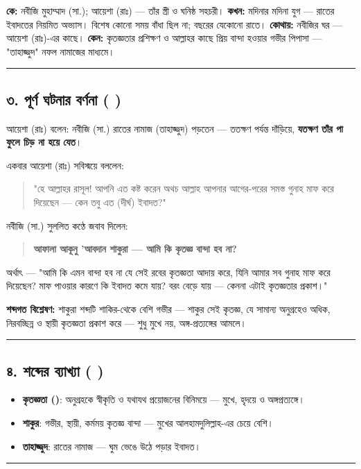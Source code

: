\textbf{কে:} নবীজি মুহাম্মাদ (সা.); আয়েশা (রাঃ) — তাঁর স্ত্রী ও ঘনিষ্ঠ সহচরী।
\textbf{কখন:} মদিনার মদিনা যুগ — রাতের ইবাদতের নিয়মিত অভ্যাস। বিশেষ কোনো সময় বাঁধা ছিল না; বছরের যেকোনো রাতে।
\textbf{কোথায়:} নবীজির ঘর — আয়েশা (রাঃ)-এর কাছে।
\textbf{কেন:} কৃতজ্ঞতার প্রশিক্ষণ ও আল্লাহর কাছে প্রিয় বান্দা হওয়ার গভীর পিপাসা — "তাহাজ্জুদ" নফল নামাজের মাধ্যমে।

\medskip\hrule\medskip

\subsection*{৩. পূর্ণ ঘটনার বর্ণনা (  )}

আয়েশা (রাঃ) বলেন: নবীজি (সা.) রাতের নামাজ (তাহাজ্জুদ) পড়তেন — ততক্ষণ পর্যন্ত দাঁড়িয়ে, \textbf{যতক্ষণ তাঁর পা ফুলে চিড় না হয়ে যেত}।

একবার আয়েশা (রাঃ) সবিস্ময়ে বললেন:
\begin{quote}
"হে আল্লাহর রাসূল! আপনি এত কষ্ট করেন অথচ আল্লাহ আপনার আগের-পরের সমস্ত গুনাহ মাফ করে দিয়েছেন — কেন তবু এত (দীর্ঘ) ইবাদত?"
\end{quote}

নবীজি (সা.) সুললিত কণ্ঠে জবাব দিলেন:
\begin{quote}
\textbf{আফালা আকূনু 'আবদান শাকুরা — আমি কি কৃতজ্ঞ বান্দা হব না?}
\end{quote}

অর্থাৎ — "আমি কি এমন বান্দা হব না যে সেই রবের কৃতজ্ঞতা আদায় করে, যিনি আমার সব গুনাহ মাফ করে দিয়েছেন? মাফ পাওয়ার কারণে কি ইবাদত কমে যায়? বরং বেড়ে যায় — কেননা এটাই কৃতজ্ঞতার প্রকাশ।"

\textbf{শব্দগত বিশ্লেষণ:} শাকুরা শব্দটি শাকির-থেকে বেশি গভীর — শাকুর সেই কৃতজ্ঞ, যে সামান্য অনুগ্রহেও অধিক, নিরবচ্ছিন্ন ও স্থায়ী কৃতজ্ঞতা প্রকাশ করে — শুধু মুখে নয়, অঙ্গ-প্রত্যঙ্গের আমলে।

\medskip\hrule\medskip

\subsection*{৪. শব্দের ব্যাখ্যা ( )}

\begin{itemize}
\item \textbf{কৃতজ্ঞতা ()}: অনুগ্রহকে স্বীকৃতি ও যথাযথ প্রয়োজনের বিনিময়ে — মুখে, হৃদয়ে ও অঙ্গপ্রত্যঙ্গে।
\item \textbf{শাকুর}: গভীর, স্থায়ী, কর্মময় কৃতজ্ঞ বান্দা — মুখের আলহামদুলিল্লাহ-এর চেয়ে বেশি।
\item \textbf{তাহাজ্জুদ}: রাতের নামাজ — ঘুম ভেঙে উঠে পড়ার ইবাদত।
\end{itemize}
\medskip\hrule\medskip

